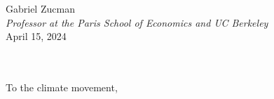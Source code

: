 \documentclass[a5paper,english,openany]{memoir}
\begin{document}
\begin{flushright}
Gabriel Zucman\\
\textit{Professor at the Paris School of Economics and UC Berkeley}\\
April 15, 2024

\clearpage
\quad \\ ~\vspace{2cm} \\
{\raggedleft To the climate movement,}
\end{flushright}
\clearpage
\end{document}
